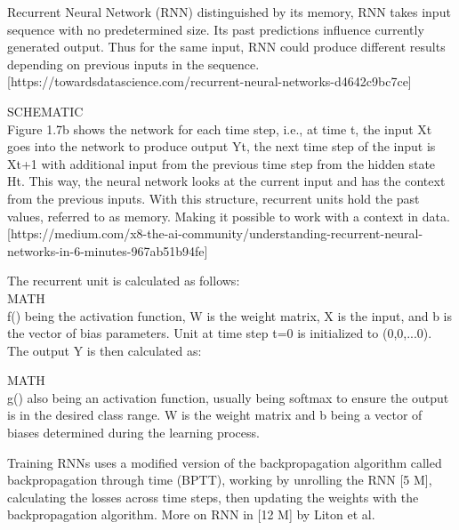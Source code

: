 Recurrent Neural Network (RNN) distinguished by its memory, RNN takes input sequence with no predetermined size. Its past predictions influence currently generated output. Thus for the same input, RNN could produce different results depending on previous inputs in the sequence.[https://towardsdatascience.com/recurrent-neural-networks-d4642c9bc7ce] \newline

SCHEMATIC\\

Figure 1.7b shows the network for each time step, i.e., at time t, the input Xt goes into the network to produce output Yt, the next time step of the input is Xt+1 with additional input from the previous time step from the hidden state Ht. This way, the neural network looks at the current input and has the context from the previous inputs.
With this structure, recurrent units hold the past values, referred to as memory. Making it possible to work with a context in data.
[https://medium.com/x8-the-ai-community/understanding-recurrent-neural-networks-in-6-minutes-967ab51b94fe]

The recurrent unit is calculated as follows:\\

MATH\\

f() being the activation function, W is the weight matrix, X is the input, and b is the vector of bias parameters. Unit at time step t=0 is initialized to (0,0,...0). The output Y is then calculated as:

MATH\\

g() also being an activation function, usually being softmax to ensure the output is in the desired class range. W is the weight matrix and b being a vector of biases determined during the learning process.

Training RNNs uses a modified version of the backpropagation algorithm called backpropagation through time (BPTT), working by unrolling the RNN [5 M], calculating the losses across time steps, then updating the weights with the backpropagation algorithm. More on RNN in [12 M] by Liton et al.





